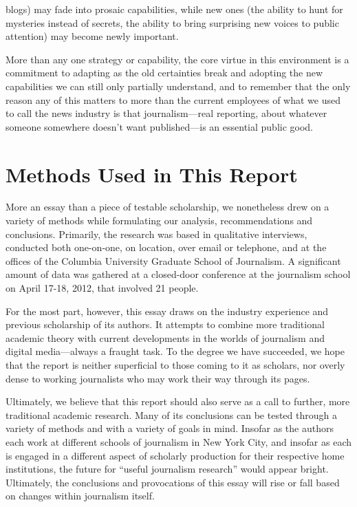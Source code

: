 blogs) may fade into prosaic capabilities, while new ones (the ability to hunt for
mysteries instead of secrets, the ability to bring surprising new voices to public
attention) may become newly important.

More than any one strategy or capability, the core virtue in this environment is a
commitment to adapting as the old certainties break and adopting the new capabilities
we can still only partially understand, and to remember that the only reason
any of this matters to more than the current employees of what we used to
call the news industry is that journalism—real reporting, about whatever someone
somewhere doesn’t want published—is an essential public good.


\chapter{Methods Used in This Report}
More an essay than a piece of testable scholarship, we nonetheless drew on a
variety of methods while formulating our analysis, recommendations and conclusions.
Primarily, the research was based in qualitative interviews, conducted
both one-on-one, on location, over email or telephone, and at the offices of the
Columbia University Graduate School of Journalism. A significant amount of
data was gathered at a closed-door conference at the journalism school on April
17-18, 2012, that involved 21 people.

For the most part, however, this essay draws on the industry experience and
previous scholarship of its authors. It attempts to combine more traditional academic
theory with current developments in the worlds of journalism and digital
media—always a fraught task. To the degree we have succeeded, we hope that the
report is neither superficial to those coming to it as scholars, nor overly dense to
working journalists who may work their way through its pages.

Ultimately, we believe that this report should also serve as a call to further, more
traditional academic research. Many of its conclusions can be tested through a variety
of methods and with a variety of goals in mind. Insofar as the authors each
work at different schools of journalism in New York City, and insofar as each is
engaged in a different aspect of scholarly production for their respective home
institutions, the future for ``useful journalism research'' would appear bright. Ultimately,
the conclusions and provocations of this essay will rise or fall based on
changes within journalism itself.



